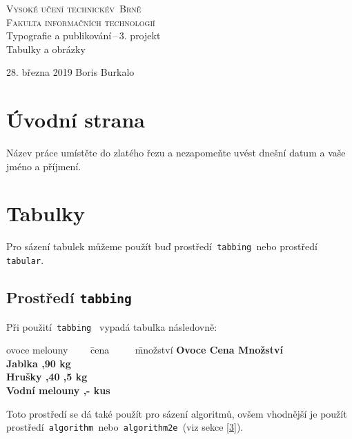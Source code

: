 \documentclass[a4paper, 11pt]{article}
\date{March 2019}
\begin{document}
\begin{titlepage}
\begin{center}
\Huge\textsc{Vysoké učení technickév~Brně\\
\huge{Fakulta informačních technologií}}\\
\LARGE{Typografie a publikování\,--\,3. projekt}\\
\Huge Tabulky a obrázky\\
\end{center}
{\Large 28. března 2019 \hfill Boris Burkalo}
\end{titlepage}


\section{Úvodní strana}\label{1}
Název práce umístěte do zlatého řezu a nezapomeňte uvést dnešní datum a vaše jméno a příjmení.

\section{Tabulky}\label{2}
Pro sázení tabulek můžeme použít buď prostředí\texttt{ tabbing }nebo prostředí\texttt{ tabular}.

\subsection{Prostředí \texttt{tabbing}}
Při použití\texttt{ tabbing } vypadá tabulka následovně:
\begin{tabbing}
ovoce melouny ~~~~\= cena ~~~~
\= množství \kill
\bfseries Ovoce \>
\bfseries Cena \>
\bfseries Množství \\
Jablka ,90  kg \\
Hrušky ,40 ,5 kg \\
Vodní melouny ,-  kus\\
\end{tabbing}
Toto prostředí se dá také použít pro sázení algoritmů, ovšem vhodnější je použít
prostředí\texttt{ algorithm }nebo\texttt{ algorithm2e }(viz sekce \ref{3}).
\end{document}
